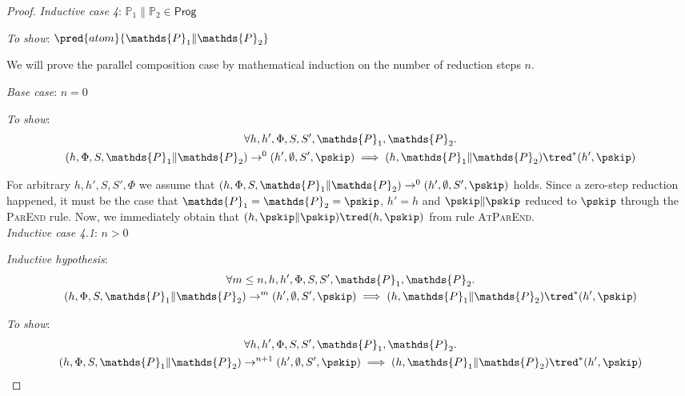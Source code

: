 {\begin{proof}
\textit{Inductive case 4}: $\mathds{P}_1 \| \mathds{P}_2 \in \mathsf{Prog}$

\textit{To show}: $\pred{atom}{\mathds{P}_1 \| \mathds{P}_2}$


We will prove the parallel composition case by mathematical induction on the number of reduction steps $n$.

\textit{Base case}: $n = 0$

\textit{To show}:
\begin{gather*}
	\forall h, h', \Phi, S, S', \mathds{P}_1, \mathds{P}_2 \ldotp \\
	(h, \Phi, S, \mathds{P}_1 \| \mathds{P}_2) \rightarrow^0 (h', \emptyset, S', \pskip)
	\implies
	(h, \mathds{P}_1 \| \mathds{P}_2) \tred^* (h', \pskip)
\end{gather*}

For arbitrary $h, h', S, S', \Phi$ we assume that $(h, \Phi, S, \mathds{P}_1 \| \mathds{P}_2) \rightarrow^0 (h', \emptyset, S', \pskip)$ holds. Since a zero-step reduction happened, it must be the case that $\mathds{P}_1 = \mathds{P}_2 = \pskip$, $h' = h$ and $\pskip \| \pskip$ reduced to $\pskip$ through the \textsc{ParEnd} rule. Now, we immediately obtain that $(h, \pskip \| \pskip) \tred (h, \pskip)$ from rule \textsc{AtParEnd}. \\

\textit{Inductive case 4.1}: $n > 0$

\textit{Inductive hypothesis}:
\begin{gather*}
	\forall m \leq n, h, h', \Phi, S, S', \mathds{P}_1, \mathds{P}_2 \ldotp \\
	(h, \Phi, S, \mathds{P}_1 \| \mathds{P}_2) \rightarrow^m (h', \emptyset, S', \pskip)
	\implies
	(h, \mathds{P}_1 \| \mathds{P}_2) \tred^* (h', \pskip)
\end{gather*}

\textit{To show}:
\begin{gather*}
	\forall h, h', \Phi, S, S', \mathds{P}_1, \mathds{P}_2 \ldotp \\
	(h, \Phi, S, \mathds{P}_1 \| \mathds{P}_2) \rightarrow^{n+1} (h', \emptyset, S', \pskip)
	\implies
	(h, \mathds{P}_1 \| \mathds{P}_2) \tred^* (h', \pskip)
\end{gather*}


\end{proof}}
